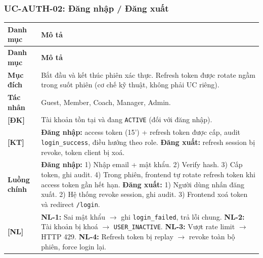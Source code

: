 \subsubsection{UC-AUTH-02: Đăng nhập / Đăng xuất}
\begingroup
\renewcommand{\arraystretch}{1.3}
\begin{longtable}{|>{\centering\arraybackslash}m{3cm}|>{\raggedright\arraybackslash}m{12cm}|}
\hline
\textbf{Danh mục} & \textbf{Mô tả} \\ \hline
\endfirsthead
\hline
\textbf{Danh mục} & \textbf{Mô tả} \\ \hline
\endhead
\hline
\endfoot
\textbf{Mục đích} & Bắt đầu và kết thúc phiên xác thực. Refresh token được rotate ngầm trong suốt phiên (cơ chế kỹ thuật, không phải UC riêng). \\
\hline
\textbf{Tác nhân} & Guest, Member, Coach, Manager, Admin. \\
\hline
\textbf{[ĐK]} & Tài khoản tồn tại và đang \texttt{ACTIVE} (đối với đăng nhập). \\
\hline
\textbf{[KT]} & \textbf{Đăng nhập:} access token (15') + refresh token được cấp, audit \texttt{login\_success}, điều hướng theo role. \textbf{Đăng xuất:} refresh session bị revoke, token client bị xoá. \\
\hline
\textbf{Luồng chính} & \textbf{Đăng nhập:} 1) Nhập email + mật khẩu. 2) Verify hash. 3) Cấp token, ghi audit. 4) Trong phiên, frontend tự rotate refresh token khi access token gần hết hạn. \textbf{Đăng xuất:} 1) Người dùng nhấn đăng xuất. 2) Hệ thống revoke session, ghi audit. 3) Frontend xoá token và redirect \texttt{/login}. \\
\hline
\textbf{[NL]} & \textbf{NL-1:} Sai mật khẩu $\rightarrow$ ghi \texttt{login\_failed}, trả lỗi chung. \textbf{NL-2:} Tài khoản bị khoá $\rightarrow$ \texttt{USER\_INACTIVE}. \textbf{NL-3:} Vượt rate limit $\rightarrow$ HTTP 429. \textbf{NL-4:} Refresh token bị replay $\rightarrow$ revoke toàn bộ phiên, force login lại. \\
\hline
\end{longtable}
\endgroup

